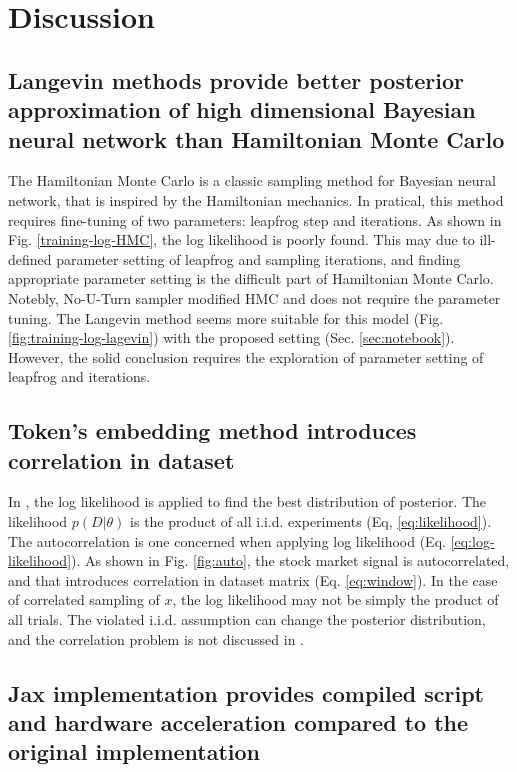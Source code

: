 \documentclass{article}
\begin{document}
\section{Discussion}

\subsection{Langevin methods provide better posterior approximation of high dimensional Bayesian neural network than Hamiltonian Monte Carlo}

The Hamiltonian Monte Carlo is a classic sampling method for Bayesian neural network\citep{neal1996}, that is inspired by the Hamiltonian mechanics. In pratical, this method requires fine-tuning of two parameters: leapfrog step and iterations. As shown in Fig. \ref{training-log-HMC}, the log likelihood is poorly found. This may due to ill-defined parameter setting of leapfrog and sampling iterations, and finding appropriate parameter setting is the difficult part of Hamiltonian Monte Carlo. Notebly, No-U-Turn sampler modified HMC and does not require the parameter tuning\citep{hoffman2014no}. The Langevin method seems more suitable for this model (Fig. \ref{fig:training-log-lagevin}) with the proposed setting (Sec. \ref{sec:notebook}). However, the solid conclusion requires the exploration of parameter setting of leapfrog and iterations.


\subsection{Token's embedding method introduces correlation in dataset }

In \cite{chandra2021bayesian}, the log likelihood is applied to find the best distribution of posterior. The likelihood $p(D|\theta)$ is the product of all i.i.d. experiments (Eq, \ref{eq:likelihood}). The autocorrelation is one concerned when applying log likelihood (Eq. \ref{eq:log-likelihood}). As shown in Fig. \ref{fig:auto}, the stock market signal is autocorrelated, and that introduces correlation in dataset matrix (Eq. \ref{eq:window}). In the case of correlated sampling of $x$, the log likelihood may not be simply the product of all trials. The violated i.i.d. assumption can change the posterior distribution, and the correlation problem is not discussed in \cite{chandra2021bayesian}.

\subsection{Jax implementation provides compiled script and hardware acceleration compared to the original implementation}
\end{document}
